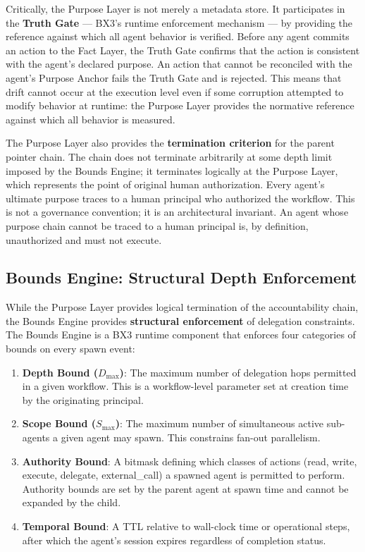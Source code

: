 Critically, the Purpose Layer is not merely a metadata store. It participates in the \textbf{Truth Gate} — BX3's runtime enforcement mechanism — by providing the reference against which all agent behavior is verified. Before any agent commits an action to the Fact Layer, the Truth Gate confirms that the action is consistent with the agent's declared purpose. An action that cannot be reconciled with the agent's Purpose Anchor fails the Truth Gate and is rejected. This means that drift cannot occur at the execution level even if some corruption attempted to modify behavior at runtime: the Purpose Layer provides the normative reference against which all behavior is measured.

The Purpose Layer also provides the \textbf{termination criterion} for the parent pointer chain. The chain does not terminate arbitrarily at some depth limit imposed by the Bounds Engine; it terminates logically at the Purpose Layer, which represents the point of original human authorization. Every agent's ultimate purpose traces to a human principal who authorized the workflow. This is not a governance convention; it is an architectural invariant. An agent whose purpose chain cannot be traced to a human principal is, by definition, unauthorized and must not execute.

\subsection{Bounds Engine: Structural Depth Enforcement}

While the Purpose Layer provides logical termination of the accountability chain, the Bounds Engine provides \textbf{structural enforcement} of delegation constraints. The Bounds Engine is a BX3 runtime component that enforces four categories of bounds on every spawn event:

\begin{enumerate}
    \item \textbf{Depth Bound ($D_{\max}$)}: The maximum number of delegation hops permitted in a given workflow. This is a workflow-level parameter set at creation time by the originating principal.
    \item \textbf{Scope Bound ($S_{\max}$)}: The maximum number of simultaneous active sub-agents a given agent may spawn. This constrains fan-out parallelism.
    \item \textbf{Authority Bound}: A bitmask defining which classes of actions (read, write, execute, delegate, external\_call) a spawned agent is permitted to perform. Authority bounds are set by the parent agent at spawn time and cannot be expanded by the child.
    \item \textbf{Temporal Bound}: A TTL relative to wall-clock time or operational steps, after which the agent's session expires regardless of completion status.
\end{enumerate}

